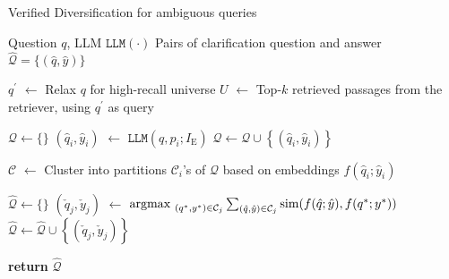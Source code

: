 \begin{algorithm*}[t]
\caption{Verified Diversification for ambiguous queries}
\begin{algorithmic}[1]
\Require Question $q$,
LLM $\texttt{LLM}(\cdot)$
\Ensure Pairs of clarification question and answer $\hat{\mathcal{Q}}=\{(\hat{q}, \hat{y})\}$

\State $q^\prime$ $\leftarrow$ Relax $q$ for high-recall universe
\State %
$U$ $\leftarrow$ Top-$k$ retrieved passages from the retriever, using $q^\prime$ as query

\State $\mathcal{Q} \leftarrow \{\}$
    \State $(\hat{q}_i, \hat{y}_i)$ $\leftarrow$ $\texttt{LLM}(q, p_i; I_{\textrm{E}})$ 
        \State $\mathcal{Q} \leftarrow \mathcal{Q} \cup \left\{ (\hat{q}_i, \hat{y}_i) \right\}$
    \EndIf
\EndFor

\State $\mathcal{C}$ $\leftarrow$ Cluster into partitions $\mathcal{C}_i$'s of $\mathcal{Q}$ based on embeddings $f(\hat{q}_i; \hat{y}_i)$

\State $\hat{\mathcal{Q}} \leftarrow \{\}$
    \State $(\check{q}_j, \check{y}_j)$ $\leftarrow$ $\argmax_{({q}^*,y^*)\in \mathcal{C}_j} \sum_{(\hat{q},\hat{y})\in \mathcal{C}_j} \mathrm{sim}(f(\hat{q};\hat{y}), f(q^*;y^*))$ 
    \State $\hat{\mathcal{Q}} \leftarrow \hat{\mathcal{Q}} \cup \left\{ (\check{q}_j, \check{y}_j) \right\}$
\EndFor

\State \textbf{return} $\hat{\mathcal{Q}}$
\end{algorithmic}
\label{alg:ours}
\end{algorithm*}

